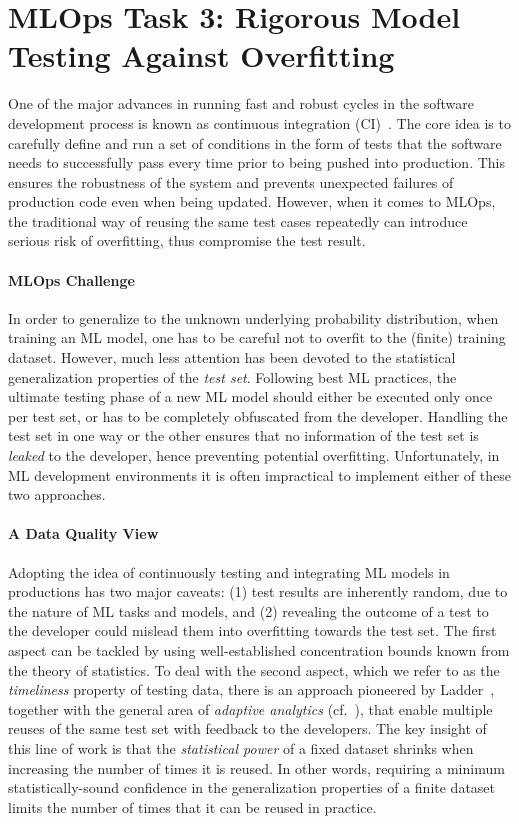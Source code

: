 \documentclass[11pt]{article}
\begin{document}
\section{MLOps Task 3: Rigorous Model Testing Against Overfitting}
\label{sec:ci}

One of the major advances in running fast and robust cycles in the software development process is known as continuous integration (CI)~\cite{duvall2007continuous}. The core idea is to carefully define and run a set of conditions in the form of tests that the software needs to successfully pass every time prior to being pushed into production. This ensures the robustness of the system and prevents unexpected failures of production code even when being updated.
However, when it comes to MLOps, the traditional 
way of reusing the same test cases repeatedly can 
introduce serious risk of overfitting, thus 
compromise the test result.

\paragraph*{MLOps Challenge}
In order to generalize to the unknown underlying probability distribution, when training an ML model, one has to be careful not to overfit to the (finite) training dataset. However, much less attention has been devoted to the statistical generalization properties of the \textit{test set}.
Following best ML practices, the ultimate testing phase of a new ML model should either be executed only once per test set, or has to be completely obfuscated from the developer. Handling the test set in one way or the other ensures that no information of the test set is \emph{leaked} to the developer, hence preventing potential overfitting. Unfortunately, in ML development environments it is often impractical to implement either of these two approaches.

\paragraph*{A Data Quality View}
Adopting the idea of continuously testing and integrating ML models in productions has two major caveats: (1) test results are inherently random, due to the nature of ML tasks and models, and (2) revealing the outcome of a test to the developer could mislead them into overfitting towards the test set.
The first aspect can be tackled by using well-established concentration bounds known from the theory of statistics.
To deal with the second aspect, which we refer to as the \textit{timeliness} property of testing data, there is an approach pioneered by Ladder~\cite{blum2015ladder}, together with the general area of \emph{adaptive analytics} (cf.~\cite{dwork2015reusable}), that enable multiple reuses of the same test set with feedback to the developers. The key insight of this line of work is that the \textit{statistical power} of a fixed dataset shrinks when increasing the number of times it is reused. In other words, requiring a minimum statistically-sound confidence in the generalization properties of a finite dataset limits the number of times that it can be reused in practice.
\end{document}
